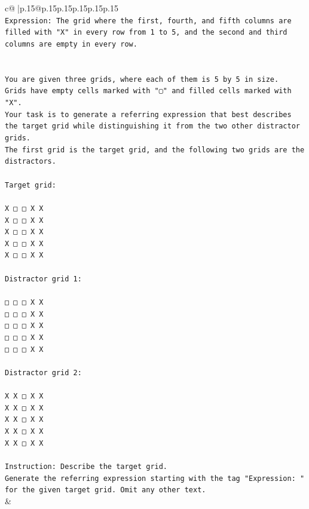 \documentclass{article}
\begin{document}
{\begin{supertabular}{c@{$\;$}|p{.15\linewidth}@{}p{.15\linewidth}p{.15\linewidth}p{.15\linewidth}p{.15\linewidth}p{.15\linewidth}}
{{{\\ 
\texttt{Expression: The grid where the first, fourth, and fifth columns are filled with "X" in every row from 1 to 5, and the second and third columns are empty in every row.} \\
\\ 
\\ 
\texttt{You are given three grids, where each of them is 5 by 5 in size.} \\
\texttt{Grids have empty cells marked with "▢" and filled cells marked with "X".} \\
\texttt{Your task is to generate a referring expression that best describes the target grid while distinguishing it from the two other distractor grids.} \\
\texttt{The first grid is the target grid, and the following two grids are the distractors.} \\
\\ 
\texttt{Target grid:} \\
\\ 
\texttt{X □ □ X X} \\
\texttt{X □ □ X X} \\
\texttt{X □ □ X X} \\
\texttt{X □ □ X X} \\
\texttt{X □ □ X X} \\
\\ 
\texttt{Distractor grid 1:} \\
\\ 
\texttt{□ □ □ X X} \\
\texttt{□ □ □ X X} \\
\texttt{□ □ □ X X} \\
\texttt{□ □ □ X X} \\
\texttt{□ □ □ X X} \\
\\ 
\texttt{Distractor grid 2:} \\
\\ 
\texttt{X X □ X X} \\
\texttt{X X □ X X} \\
\texttt{X X □ X X} \\
\texttt{X X □ X X} \\
\texttt{X X □ X X} \\
\\ 
\texttt{Instruction: Describe the target grid.} \\
\texttt{Generate the referring expression starting with the tag "Expression: " for the given target grid. Omit any other text.} \\
            }
        }
    }
    & \\ \\


\end{supertabular}}
\end{document}
